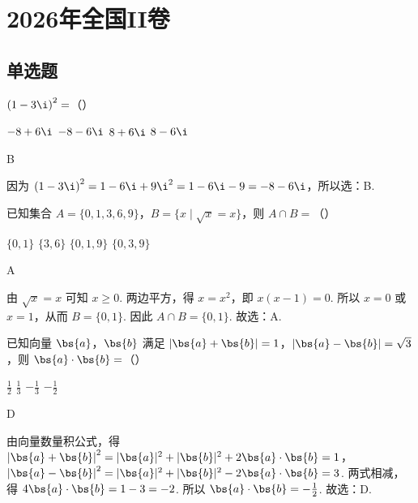\chapter{2026年全国II卷}

\section{单选题}

\begin{problem}
\(\left( 1-3\i \right)^2=\)（\quad）

\choices
    {\(-8+6\i\)}
    {\(-8-6\i\)}
    {\(8+6\i\)}
    {\(8-6\i\)}
\end{problem}

\begin{answer}
B
\end{answer}

\begin{solution}
因为 \(\left( 1-3\i \right)^2=1-6\i+9\i^2=1-6\i-9=-8-6\i\)，所以选：B.
\end{solution}

\begin{problem}
已知集合 \(A=\{0,1,3,6,9\}\)，\(B=\{x \mid \sqrt{x}=x\}\)，则 \(A\cap B=\)（\quad）

\choices
    {\(\{0,1\}\)}
    {\(\{3,6\}\)}
    {\(\{0,1,9\}\)}
    {\(\{0,3,9\}\)}
\end{problem}

\begin{answer}
A
\end{answer}

\begin{solution}
由 \(\sqrt{x}=x\) 可知 \(x\ge 0\). 两边平方，得 \(x=x^2\)，即 \(x\left( x-1 \right)=0\). 所以 \(x=0\) 或 \(x=1\)，从而 \(B=\{0,1\}\). 因此 \(A\cap B=\{0,1\}\). 故选：A.
\end{solution}

\begin{problem}
已知向量 \(\bs{a}\)，\(\bs{b}\) 满足 \(\left| \bs{a}+\bs{b} \right|=1\)，\(\left| \bs{a}-\bs{b} \right|=\sqrt{3}\)，则 \(\bs{a}\cdot \bs{b}=\)（\quad）

\choices
    {\(\frac{1}{2}\)}
    {\(\frac{1}{3}\)}
    {\(-\frac{1}{3}\)}
    {\(-\frac{1}{2}\)}
\end{problem}

\begin{answer}
D
\end{answer}

\begin{solution}
由向量数量积公式，得 \(\left| \bs{a}+\bs{b} \right|^2=\lvert \bs{a} \rvert^2+\lvert \bs{b} \rvert^2+2\bs{a}\cdot \bs{b}=1\)，\(\left| \bs{a}-\bs{b} \right|^2=\lvert \bs{a} \rvert^2+\lvert \bs{b} \rvert^2-2\bs{a}\cdot \bs{b}=3\). 两式相减，得 \(4\bs{a}\cdot \bs{b}=1-3=-2\). 所以 \(\bs{a}\cdot \bs{b}=-\frac{1}{2}\). 故选：D.
\end{solution}

